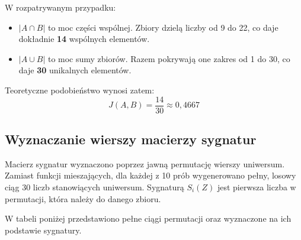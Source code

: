 \documentclass[12pt,a4paper]{article}
\begin{document}
W rozpatrywanym przypadku:
\begin{itemize}
    \item $|A \cap B|$ to moc części wspólnej. Zbiory dzielą liczby od 9 do 22, co daje dokładnie \textbf{14} wspólnych elementów.
    \item $|A \cup B|$ to moc sumy zbiorów. Razem pokrywają one zakres od 1 do 30, co daje \textbf{30} unikalnych elementów.
\end{itemize}

Teoretyczne podobieństwo wynosi zatem:
\begin{equation}
J(A, B) = \frac{14}{30} \approx 0,4667
\end{equation}

\subsection{Wyznaczanie wierszy macierzy sygnatur}

Macierz sygnatur wyznaczono poprzez jawną permutację wierszy uniwersum. Zamiast funkcji mieszających, dla każdej z 10 prób wygenerowano pełny, losowy ciąg 30 liczb stanowiących uniwersum. Sygnaturą $S_i(Z)$ jest pierwsza liczba w permutacji, która należy do danego zbioru.

W tabeli poniżej przedstawiono pełne ciągi permutacji oraz wyznaczone na ich podstawie sygnatury.
\end{document}
